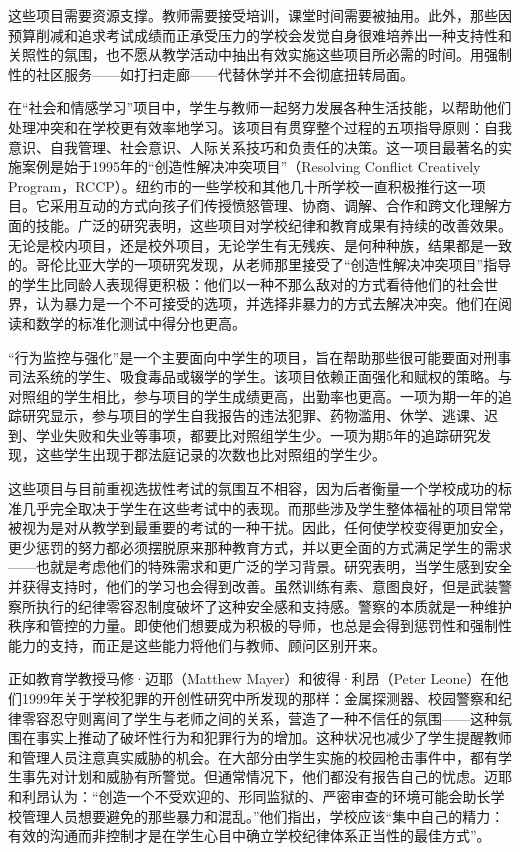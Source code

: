 \documentclass[fontset=fandol, a4paper, 12pt, openright]{ctexbook}
\begin{document}
这些项目需要资源支撑。教师需要接受培训，课堂时间需要被抽用。此外，那些因预算削减和追求考试成绩而正承受压力的学校会发觉自身很难培养出一种支持性和关照性的氛围，也不愿从教学活动中抽出有效实施这些项目所必需的时间。用强制性的社区服务——如打扫走廊——代替休学并不会彻底扭转局面。

在“社会和情感学习”项目中，学生与教师一起努力发展各种生活技能，以帮助他们处理冲突和在学校更有效率地学习。该项目有贯穿整个过程的五项指导原则：自我意识、自我管理、社会意识、人际关系技巧和负责任的决策。这一项目最著名的实施案例是始于1995年的“创造性解决冲突项目”（Resolving Conflict Creatively Program，RCCP）。纽约市的一些学校和其他几十所学校一直积极推行这一项目。它采用互动的方式向孩子们传授愤怒管理、协商、调解、合作和跨文化理解方面的技能。广泛的研究表明，这些项目对学校纪律和教育成果有持续的改善效果。无论是校内项目，还是校外项目，无论学生有无残疾、是何种种族，结果都是一致的。哥伦比亚大学的一项研究发现，从老师那里接受了“创造性解决冲突项目”指导的学生比同龄人表现得更积极：他们以一种不那么敌对的方式看待他们的社会世界，认为暴力是一个不可接受的选项，并选择非暴力的方式去解决冲突。他们在阅读和数学的标准化测试中得分也更高。

“行为监控与强化”是一个主要面向中学生的项目，旨在帮助那些很可能要面对刑事司法系统的学生、吸食毒品或辍学的学生。该项目依赖正面强化和赋权的策略。与对照组的学生相比，参与项目的学生成绩更高，出勤率也更高。一项为期一年的追踪研究显示，参与项目的学生自我报告的违法犯罪、药物滥用、休学、逃课、迟到、学业失败和失业等事项，都要比对照组学生少。一项为期5年的追踪研究发现，这些学生出现于郡法庭记录的次数也比对照组的学生少。

这些项目与目前重视选拔性考试的氛围互不相容，因为后者衡量一个学校成功的标准几乎完全取决于学生在这些考试中的表现。而那些涉及学生整体福祉的项目常常被视为是对从教学到最重要的考试的一种干扰。因此，任何使学校变得更加安全，更少惩罚的努力都必须摆脱原来那种教育方式，并以更全面的方式满足学生的需求——也就是考虑他们的特殊需求和更广泛的学习背景。研究表明，当学生感到安全并获得支持时，他们的学习也会得到改善。虽然训练有素、意图良好，但是武装警察所执行的纪律零容忍制度破坏了这种安全感和支持感。警察的本质就是一种维护秩序和管控的力量。即使他们想要成为积极的导师，也总是会得到惩罚性和强制性能力的支持，而正是这些能力将他们与教师、顾问区别开来。

正如教育学教授马修·迈耶（Matthew Mayer）和彼得·利昂（Peter Leone）在他们1999年关于学校犯罪的开创性研究中所发现的那样：金属探测器、校园警察和纪律零容忍守则离间了学生与老师之间的关系，营造了一种不信任的氛围——这种氛围在事实上推动了破坏性行为和犯罪行为的增加。这种状况也减少了学生提醒教师和管理人员注意真实威胁的机会。在大部分由学生实施的校园枪击事件中，都有学生事先对计划和威胁有所警觉。但通常情况下，他们都没有报告自己的忧虑。迈耶和利昂认为：“创造一个不受欢迎的、形同监狱的、严密审查的环境可能会助长学校管理人员想要避免的那些暴力和混乱。”他们指出，学校应该“集中自己的精力：有效的沟通而非控制才是在学生心目中确立学校纪律体系正当性的最佳方式”。
\end{document}
